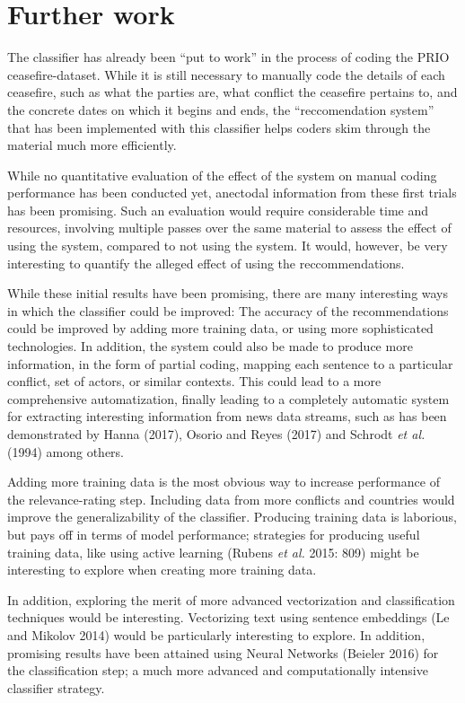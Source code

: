 \documentclass[12pt,twoside]{reedthesis}
\begin{document}
\section{Further work}\label{further-work}

The classifier has already been ``put to work'' in the process of coding
the PRIO ceasefire-dataset. While it is still necessary to manually code
the details of each ceasefire, such as what the parties are, what
conflict the ceasefire pertains to, and the concrete dates on which it
begins and ends, the ``reccomendation system'' that has been implemented
with this classifier helps coders skim through the material much more
efficiently.

While no quantitative evaluation of the effect of the system on manual
coding performance has been conducted yet, anectodal information from
these first trials has been promising. Such an evaluation would require
considerable time and resources, involving multiple passes over the same
material to assess the effect of using the system, compared to not using
the system. It would, however, be very interesting to quantify the
alleged effect of using the reccommendations.

While these initial results have been promising, there are many
interesting ways in which the classifier could be improved: The accuracy
of the recommendations could be improved by adding more training data,
or using more sophisticated technologies. In addition, the system could
also be made to produce more information, in the form of partial coding,
mapping each sentence to a particular conflict, set of actors, or
similar contexts. This could lead to a more comprehensive
automatization, finally leading to a completely automatic system for
extracting interesting information from news data streams, such as has
been demonstrated by Hanna (2017), Osorio and Reyes (2017) and Schrodt
\emph{et al.} (1994) among others.

Adding more training data is the most obvious way to increase
performance of the relevance-rating step. Including data from more
conflicts and countries would improve the generalizability of the
classifier. Producing training data is laborious, but pays off in terms
of model performance; strategies for producing useful training data,
like using active learning (Rubens \emph{et al.} 2015: 809) might be
interesting to explore when creating more training data.

In addition, exploring the merit of more advanced vectorization and
classification techniques would be interesting. Vectorizing text using
sentence embeddings (Le and Mikolov 2014) would be particularly
interesting to explore. In addition, promising results have been
attained using Neural Networks (Beieler 2016) for the classification
step; a much more advanced and computationally intensive classifier
strategy.
\end{document}
